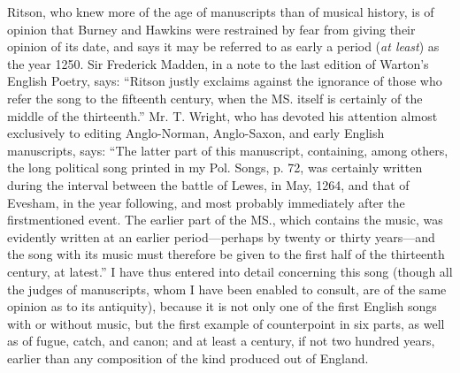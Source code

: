 Ritson, who knew more of the age of manuscripts than of musical history, is
of opinion that Burney and Hawkins were restrained by fear from giving their
opinion of its date, and says it may be referred to as early a period (\textit{at least}) as
the year 1250. Sir Frederick Madden, in a note to the last edition of Warton’s
English Poetry, says: “Ritson justly exclaims against the ignorance of those who
refer the song to the fifteenth century, when the MS. itself is certainly of the
middle of the thirteenth.” Mr. T. Wright, who has devoted his attention
almost exclusively to editing Anglo-Norman, Anglo-Saxon, and early English
manuscripts, says: “The latter part of this manuscript, containing, among others,
the long political song printed in my Pol. Songs, p. 72, was certainly written
during the interval between the battle of Lewes, in May, 1264, and that of
Evesham, in the year following, and most probably immediately after the firstmentioned
event. The earlier part of the MS., \pagebreak 
which contains the music, was
evidently written at an earlier period—perhaps by twenty or thirty years—and
the song with its music must therefore be given to the first half of the thirteenth 
century, at latest.” I have thus entered into detail concerning this song
(though all the judges of manuscripts, whom I have been enabled to consult, are
of the same opinion as to its antiquity), because it is not only one of the first
English songs with or without music, but the first example of counterpoint in six
parts, as well as of fugue, catch, and canon; and at least a century, if not two
hundred years, earlier than any composition of the kind produced out of
England.


